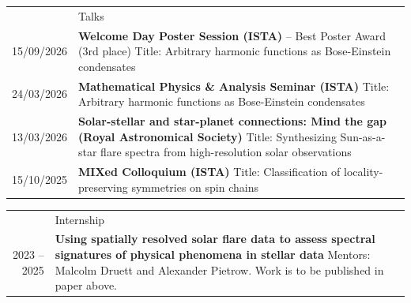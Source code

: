 \documentclass[letterpaper, 11pt]{article}
\newcommand{\headingfont}{\Large\color{OliveGreen}}
\newenvironment{SectionTable}[1]{
	\renewcommand*{\arraystretch}{1.7}
	\setlength{\tabcolsep}{10pt}
	\begin{longtable}{Rp{5.2in}} & #1 \\}
{\end{longtable}\vspace{-1.5cm}}
\begin{document}
\begin{SectionTable}{\headingfont Talks}
15/09/2026 &\textbf{Welcome Day Poster Session (ISTA)} -- Best Poster Award (3rd place)\newline
Title: Arbitrary harmonic functions as Bose-Einstein condensates\\

24/03/2026 &\textbf{Mathematical Physics \& Analysis Seminar (ISTA)}\newline
Title: Arbitrary harmonic functions as Bose-Einstein condensates\\

13/03/2026 &\textbf{Solar-stellar and star-planet connections: Mind the gap (Royal Astronomical Society)}\newline
Title: Synthesizing Sun-as-a-star flare spectra from high-resolution solar observations\\

15/10/2025 &\textbf{MIXed Colloquium (ISTA)}\newline
Title: Classification of locality-preserving symmetries on spin chains\\
\end{SectionTable}


\begin{SectionTable}{\headingfont Internship}
2023 -- 2025 &
\textbf{Using spatially resolved solar flare data to assess spectral signatures of
physical phenomena in stellar data} \newline
Mentors: Malcolm Druett and Alexander Pietrow. \newline
Work is to be published in paper above. \\

\end{SectionTable}
\end{document}
